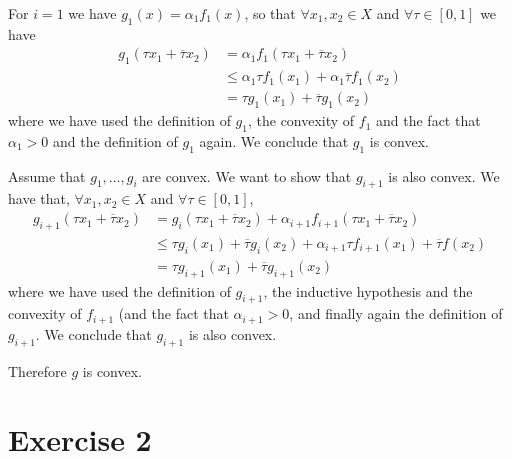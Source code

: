 \documentclass[12pt]{extarticle}
\numberwithin{equation}{section}
\begin{document}
\begin{description}[font=\normalfont\itshape]
	\item[Base step] For $i = 1$ we have $g_1(x) = \alpha_1 f_1(x)$, so that $\forall x_1, x_2 \in X$
	      and $\forall \tau \in [0, 1]$ we have
	      \begin{align}
		      g_1(\tau x_1 + \overline \tau x_2) & = \alpha_1 f_1(\tau x_1 + \overline \tau x_2)                  \\
		                                         & \leq \alpha_1 \tau f_1(x_1) + \alpha_1 \overline \tau f_1(x_2) \\
		                                         & = \tau g_1(x_1) + \overline \tau g_1(x_2)
	      \end{align}
	      where we have used the definition of $g_1$, the convexity of $f_1$ and the fact that
	      $\alpha_1 > 0$ and the definition of
	      $g_1$ again.
	      We conclude that $g_1$ is convex.
	\item[Inductive step] Assume that $g_1, \dots, g_i$ are convex. We want to show that $g_{i+1}$ is
	      also convex.
	      We have that, $\forall x_1, x_2 \in X$ and $\forall \tau \in [0, 1]$,
	      \begin{align}
		      g_{i + 1}(\tau x_1 + \overline \tau x_2) & = g_i(\tau x_1 + \overline \tau x_2) +
		      \alpha_{i + 1} f_{i + 1}(\tau x_1 + \overline \tau x_2)                                      \\
		                                               & \leq \tau g_i(x_1) + \overline \tau g_i(x_2) +
		      \alpha_{i+1} \tau f_{i+1}(x_1) + \overline \tau f(x_2)                                       \\
		                                               & = \tau g_{i+1}(x_1) + \overline \tau g_{i+1}(x_2)
	      \end{align}
	      where we have used the definition of $g_{i+1}$, the inductive hypothesis and the convexity
	      of $f_{i+1}$ (and the fact that $\alpha_{i+1} > 0$, and finally again the definition of
	      $g_{i+1}$. We conclude that $g_{i+1}$ is also convex.
\end{description}

Therefore $g$ is convex.

\clearpage

\section*{Exercise 2}
\end{document}
